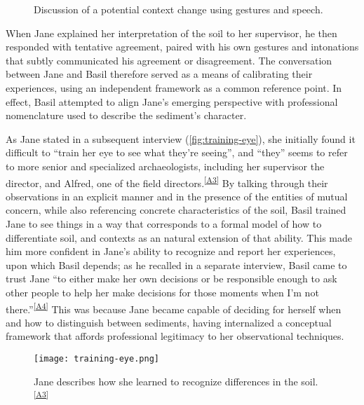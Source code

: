 \begin{sidewaysfigure}
\centering
\setlength{\fboxsep}{1pt}
\setlength{\fboxrule}{1pt}
\caption[Discussion of a potential context change using gestures and speech.]{Discussion of a potential context change using gestures and speech.}
\label{fig:context-change-discussion}
\end{sidewaysfigure}

When Jane explained her interpretation of the soil to her supervisor, he then responded with tentative agreement, paired with his own gestures and intonations that subtly communicated his agreement or disagreement.
The conversation between Jane and Basil therefore served as a means of calibrating their experiences, using an independent framework as a common reference point.
In effect, Basil attempted to align Jane's emerging perspective with professional nomenclature used to describe the sediment's character.

As Jane stated in a subsequent interview (\autoref{fig:training-eye}), she initially found it difficult to ``train her eye to see what they're seeing'', and ``they'' seems to refer to more senior and specialized archaeologists, including her supervisor the director, and Alfred, one of the field directors.\textsuperscript{\ref{A3}}
By talking through their observations in an explicit manner and in the presence of the entities of mutual concern, while also referencing concrete characteristics of the soil, Basil trained Jane to see things in a way that corresponds to a formal model of how to differentiate soil, and contexts as an natural extension of that ability.
This made him more confident in Jane's ability to recognize and report her experiences, upon which Basil depends; as he recalled in a separate interview, Basil came to trust Jane ``to either make her own decisions or be responsible enough to ask other people to help her make decisions for those moments when I'm not there.''\textsuperscript{\ref{A4}}
This was because Jane became capable of deciding for herself when and how to distinguish between sediments, having internalized a conceptual framework that affords professional legitimacy to her observational techniques.

\begin{figure}[H]
  \centering
  \setlength{\fboxsep}{1pt}
  \setlength{\fboxrule}{1pt}
  \texttt{[image: training-eye.png]}
  \caption{Jane describes how she learned to recognize differences in the soil.\textsuperscript{\ref{A3}}}
  \label{fig:training-eye}
\end{figure}

